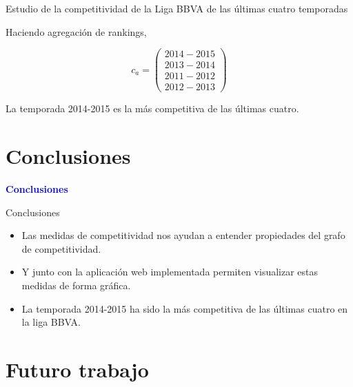 \documentclass[10pt,hyperref={unicode}]{beamer}
\begin{document}
	\begin{frame}{Estudio de la competitividad de la Liga BBVA de las últimas cuatro temporadas}
	
	Haciendo agregación de rankings,
	
	\vspace*{2em}
	
	\begin{equation*}
	c_a = \left( \begin{array}{c}
					2014-2015 \\
					2013-2014 \\
					2011-2012 \\
					2012-2013
					\end{array} \right)
	\end{equation*}
	
	\vspace*{2em}
	
	La temporada 2014-2015 es la más competitiva de las últimas cuatro.
	
	
	
	\end{frame}
	
	\section{Conclusiones}
		
		\begin{frame}
			\begin{center}
				\Huge\textbf{\textsf{\textcolor{blue}{Conclusiones}}}
			\end{center}
		\end{frame}
		
		\begin{frame}{Conclusiones}
				\begin{itemize}
					\item Las medidas de competitividad nos ayudan a entender propiedades del grafo de competitividad.
					
					\item Y junto con la aplicación web implementada permiten visualizar estas medidas de forma gráfica.
					
					\item La temporada 2014-2015 ha sido la más competitiva de las últimas cuatro en la liga BBVA.
					
				\end{itemize}
			\end{frame}
			
	
	\section{Futuro trabajo}
	
\end{document}
